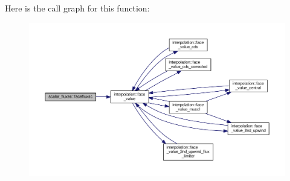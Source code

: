 Here is the call graph for this function\-:\nopagebreak
\begin{figure}[H]
\begin{center}
\leavevmode
\includegraphics[width=350pt]{classscalar__fluxes_a9bf68bb8b4ce0224ee86ed64331e4743_cgraph}
\end{center}
\end{figure}


